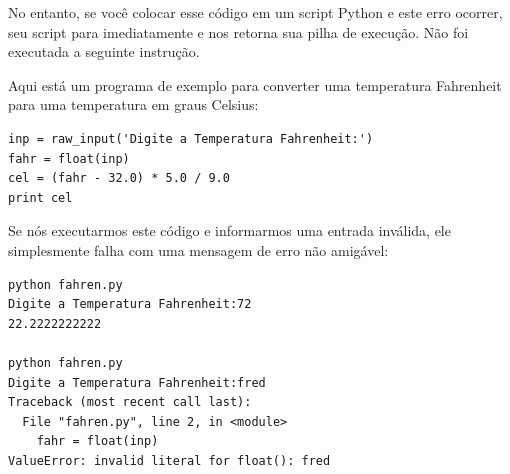
No entanto, se você colocar esse código em um
script Python e este erro ocorrer, seu script para imediatamente
e nos retorna sua pilha de execução.
Não foi executada a seguinte instrução.



Aqui está um programa de exemplo para converter uma temperatura Fahrenheit
para uma temperatura em graus Celsius:


\beforeverb
\begin{verbatim}
inp = raw_input('Digite a Temperatura Fahrenheit:')
fahr = float(inp)
cel = (fahr - 32.0) * 5.0 / 9.0
print cel
\end{verbatim}
\afterverb
%

Se nós executarmos este código e informarmos uma entrada inválida, ele simplesmente falha
com uma mensagem de erro não amigável:


\beforeverb
\begin{verbatim}
python fahren.py 
Digite a Temperatura Fahrenheit:72
22.2222222222

python fahren.py 
Digite a Temperatura Fahrenheit:fred
Traceback (most recent call last):
  File "fahren.py", line 2, in <module>
    fahr = float(inp)
ValueError: invalid literal for float(): fred
\end{verbatim}
\afterverb

%

